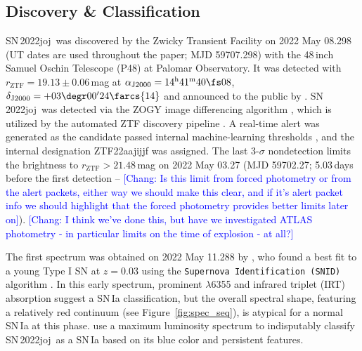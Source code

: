 \documentclass[twocolumn]{aastex631}
\newcommand{\sn}{SN\,2022joj}
\newcommand{\chang}[1]{\textcolor{blue}{[Chang: #1]}}
\begin{document}
\begin{CJK*}{UTF8}{gbsn}
\subsection{Discovery \& Classification}
\sn\ was discovered by the Zwicky Transient Facility \citep[ZTF;][]{Bellm_ZTF_2019a,Graham_ZTF_2019,Dekany_ZTF_2020} on 2022 May 08.298 (UT dates are used throughout the paper; MJD 59707.298) with the 48\,inch Samuel Oschin Telescope (P48) at Palomar Observatory. It was detected with $r_\mathrm{ZTF}=19.13\pm0.06$\,mag at $\alpha_\mathrm{J2000}=14^\mathrm{h}41^\mathrm{m}40\fs08$, $\delta_\mathrm{J2000}=+03\degr00'24\farcs{14}$ and announced to the public by \citet{Fremling_2022TNSTR}. \sn\ was detected via the ZOGY image differencing algorithm \citep{Zackay_imagesub_2016}, which is utilized by the automated ZTF discovery pipeline \citep{Masci_ZTF_2019}. A real-time alert \citep{Patterson_ZTFalert_2019} was generated as the candidate passed internal machine-learning thresholds \citep[e.g.,][]{Duev_ZTFML_2019,Mahabal_ZTFML_2019}, and the internal designation ZTF22aajijjf was assigned. The last 3-$\sigma$ nondetection limits the brightness to $r_\mathrm{ZTF}>21.48$\,mag on 2022 May 03.27 (MJD 59702.27; 5.03\,days before the first detection -- \chang{Is this limit from forced photometry or from the alert packets, either way we should make this clear, and if it's alert packet info we should highlight that the forced photometry provides better limits later on}). \chang{I think we've done this, but have we investigated ATLAS photometry - in particular limits on the time of explosion - at all?}

The first spectrum was obtained on 2022 May 11.288 by \citet{Newsome_2022TNSCR}, who found a best fit to a young Type I SN at $z=0.03$ using the \texttt{Supernova Identification (SNID)} algorithm \citep{Blondin_SNID_2007}. In this early spectrum, prominent  $\lambda$6355 and  infrared triplet (IRT) absorption suggest a SN\,Ia classification, but the overall spectral shape, featuring a relatively red continuum (see Figure~\ref{fig:spec_seq}), is atypical for a normal SN\,Ia at this phase. \citet{Chu_2022TNSCR} use a maximum luminosity spectrum to indisputably classify \sn\ as a SN\,Ia based on its blue color and persistent  features.


\end{CJK*}
\end{document}
